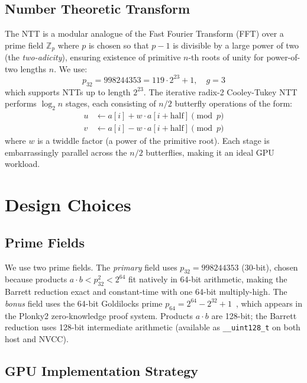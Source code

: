 \documentclass[conference]{IEEEtran}
\begin{document}
\subsection{Number Theoretic Transform}

The NTT is a modular analogue of the Fast Fourier Transform (FFT) over a prime field $\mathbb{Z}_p$
where $p$ is chosen so that $p - 1$ is divisible by a large power of two (the \emph{two-adicity}),
ensuring existence of primitive $n$-th roots of unity for power-of-two lengths $n$. We use:
\begin{equation}
  p_{32} = 998244353 = 119 \cdot 2^{23} + 1, \quad g = 3
\end{equation}
which supports NTTs up to length $2^{23}$. The iterative radix-2 Cooley-Tukey NTT performs
$\log_2 n$ stages, each consisting of $n/2$ butterfly operations of the form:
\begin{align}
  u &\leftarrow a[i] + w \cdot a[i + \text{half}] \pmod{p} \\
  v &\leftarrow a[i] - w \cdot a[i + \text{half}] \pmod{p}
\end{align}
where $w$ is a twiddle factor (a power of the primitive root). Each stage is embarrassingly parallel
across the $n/2$ butterflies, making it an ideal GPU workload.

\section{Design Choices}
\label{sec:design}

\subsection{Prime Fields}

We use two prime fields. The \emph{primary} field uses $p_{32} = 998244353$ (30-bit), chosen
because products $a \cdot b < p_{32}^2 < 2^{64}$ fit natively in 64-bit arithmetic, making the
Barrett reduction exact and constant-time with one 64-bit multiply-high. The \emph{bonus} field
uses the 64-bit Goldilocks prime $p_{64} = 2^{64} - 2^{32} + 1$~\cite{goldilocks}, which appears
in the Plonky2 zero-knowledge proof system. Products $a \cdot b$ are 128-bit; the Barrett reduction
uses 128-bit intermediate arithmetic (available as \texttt{\_\_uint128\_t} on both host and NVCC).

\subsection{GPU Implementation Strategy}
\end{document}
